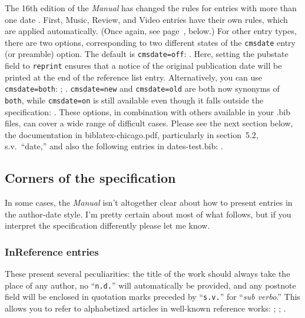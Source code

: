\documentclass[a4paper,12pt]{report}
\begin{document}
The 16th edition of the \emph{Manual} has changed the rules for
entries with more than one date \autocite[15.38]{chicago:manual}.
First, \textsf{Music}, \textsf{Review}, and \textsf{Video} entries
have their own rules, which are applied automatically.  (Once again,
see page~\pageref{sec:audiovisual}, below.)  For other entry types,
there are two options, corresponding to two different states of the
\texttt{cmsdate} entry (or preamble) option.  The default is
\texttt{cmsdate=off}: \autocite{maitland:equity}.  Here, setting the
\textsf{pubstate} field to \texttt{reprint} ensures that a notice of
the original publication date will be printed at the end of the
reference list entry.  Alternatively, you can use
\texttt{cmsdate=both}: \autocite{emerson:nature};
\autocite{maitland:canon}.  \texttt{cmsdate=new} and
\texttt{cmsdate=old} are both now synonyms of \texttt{both}, while
\texttt{cmsdate=on} is still available even though it falls outside
the specification: \autocite{james:ambassadors}.  These options, in
combination with others available in your .bib files, can cover a wide
range of difficult cases.  Please see the next section below, the
documentation in \textsf{biblatex-chicago.pdf}, particularly in
section~5.2, s.v.\ \enquote{\textsf{date},} and also the following
entries in \textsf{dates-test.bib}:
\autocites{schweitzer:bach}{white:russ}{white:ross:memo}.

\subsection*{Corners of the specification}
\label{sec:corners}

In some cases, the \emph{Manual} isn't altogether clear about how to
present entries in the author-date style.  I'm pretty certain about
most of what follows, but if you interpret the specification
differently please let me know.

\subsubsection*{InReference entries}
\label{sec:inref}

These present several peculiarities: the title of the work should
always take the place of any author, no
\enquote{\texttt{n.d.}\hspace{-2pt}} will automatically be provided,
and any postnote field will be enclosed in quotation marks preceded by
\enquote{\texttt{s.v.}\hspace{-2pt}} for \enquote{\emph{sub verbo}.}
This allows you to refer to alphabetized articles in well-known
reference works: \autocite[Hume, David]{ency:britannica};
\autocite[Sibelius, Jean]{grove:sibelius};
\autocite[BibTeX]{wikiped:bibtex}.
\end{document}
